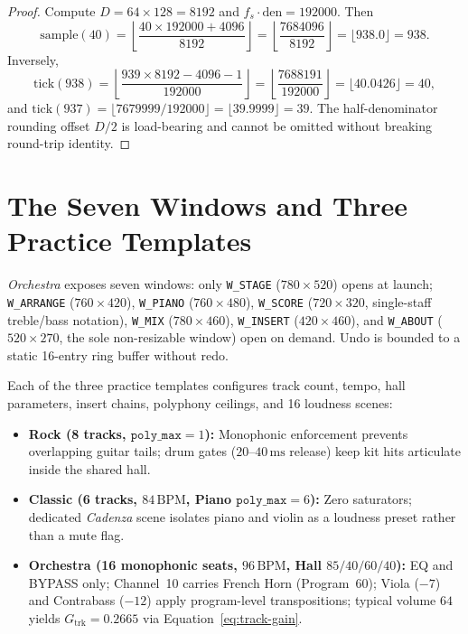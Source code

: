 \begin{proof}
Compute $D = 64 \times 128 = 8192$ and $f_s \cdot \mathrm{den} = 192000$. Then
\[
\mathrm{sample}(40) = \left\lfloor \frac{40 \times 192000 + 4096}{8192} \right\rfloor = \left\lfloor \frac{7684096}{8192} \right\rfloor = \lfloor 938.0 \rfloor = 938.
\]
Inversely,
\[
\mathrm{tick}(938) = \left\lfloor \frac{939 \times 8192 - 4096 - 1}{192000} \right\rfloor = \left\lfloor \frac{7688191}{192000} \right\rfloor = \lfloor 40.0426 \rfloor = 40,
\]
and $\mathrm{tick}(937) = \lfloor 7679999 / 192000 \rfloor = \lfloor 39.9999 \rfloor = 39$. The half-denominator rounding offset $D/2$ is load-bearing and cannot be omitted without breaking round-trip identity.
\end{proof}

\section{The Seven Windows and Three Practice Templates}

\emph{Orchestra} exposes seven windows: only \texttt{W\_STAGE} ($780\times 520$) opens at launch; \texttt{W\_ARRANGE} ($760\times 420$), \texttt{W\_PIANO} ($760\times 480$), \texttt{W\_SCORE} ($720\times 320$, single-staff treble/bass notation), \texttt{W\_MIX} ($780\times 460$), \texttt{W\_INSERT} ($420\times 460$), and \texttt{W\_ABOUT} ($520\times 270$, the sole non-resizable window) open on demand. Undo is bounded to a static 16-entry ring buffer without redo.

Each of the three practice templates configures track count, tempo, hall parameters, insert chains, polyphony ceilings, and 16 loudness scenes:
\begin{itemize}[leftmargin=1.5em]
  \item \textbf{Rock (8 tracks, $\texttt{poly\_max} = 1$):} Monophonic enforcement prevents overlapping guitar tails; drum gates ($20$--$40\,\text{ms}$ release) keep kit hits articulate inside the shared hall.
  \item \textbf{Classic (6 tracks, $84\,\text{BPM}$, Piano $\texttt{poly\_max} = 6$):} Zero saturators; dedicated \emph{Cadenza} scene isolates piano and violin as a loudness preset rather than a mute flag.
  \item \textbf{Orchestra (16 monophonic seats, $96\,\text{BPM}$, Hall $85/40/60/40$):} EQ and BYPASS only; Channel~10 carries French Horn (Program~60); Viola ($-7$) and Contrabass ($-12$) apply program-level transpositions; typical volume $64$ yields $G_{\mathrm{trk}} = 0.2665$ via Equation~\eqref{eq:track-gain}.
\end{itemize}

